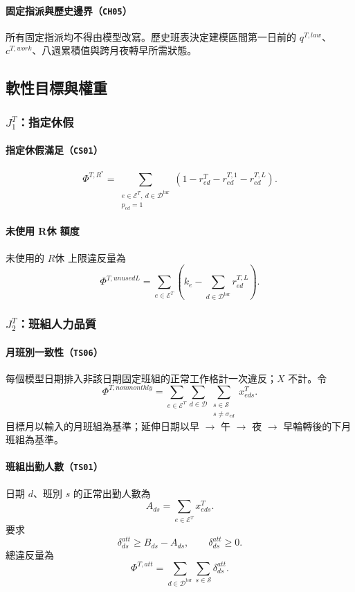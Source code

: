 \documentclass[a4paper,12pt]{article}
\begin{document}
\paragraph{固定指派與歷史邊界（\texttt{CH05}）}
所有固定指派均不得由模型改寫。歷史班表決定建模區間第一日前的
\(q^{T,law}\)、\(c^{T,work}\)、八週累積值與跨月夜轉早所需狀態。

\subsection{軟性目標與權重}

\subsubsection{\texorpdfstring{$J^T_1$}{J1}：指定休假}

\paragraph{指定休假滿足（\texttt{CS01}）}
\[
  \Phi^{T,R^*}
  =
  \sum_{\substack{e\in\mathcal{E}^{T},\ d\in\mathcal{D}^{\mathrm{tar}}\\p_{ed}=1}}
  \left(1-r^{T}_{ed}-r^{T,1}_{ed}-r^{T,L}_{ed}\right).
\]

\paragraph{未使用 R休 額度}
未使用的 \(R休\) 上限違反量為
\[
  \Phi^{T,unusedL}
  =\sum_{e\in\mathcal{E}^{T}}
  \left(k_e-\sum_{d\in\mathcal{D}^{\mathrm{tar}}}r^{T,L}_{ed}\right).
\]

\subsubsection{\texorpdfstring{$J^T_2$}{J2}：班組人力品質}

\paragraph{月班別一致性（\texttt{TS06}）}
每個模型日期排入非該日期固定班組的正常工作格計一次違反；\(X\) 不計。令
\[
  \Phi^{T,nonmonthly}
  =
  \sum_{e\in\mathcal{E}^{T}}
  \sum_{d\in\mathcal{D}}
  \sum_{\substack{s\in\mathcal{S}\\s\neq\sigma_{ed}}}x^{T}_{eds}.
\]
目標月以輸入的月班組為基準；延伸日期以早 \(\rightarrow\) 午 \(\rightarrow\) 夜
\(\rightarrow\) 早輪轉後的下月班組為基準。

\paragraph{班組出勤人數（\texttt{TS01}）}
日期 \(d\)、班別 \(s\) 的正常出勤人數為
\[
  A_{ds}
  =
  \sum_{e\in\mathcal{E}^{T}}x^{T}_{eds}.
\]
要求
\[
  \delta^{att}_{ds}\geq B_{ds}-A_{ds},
  \qquad
  \delta^{att}_{ds}\geq0.
\]
總違反量為
\[
  \Phi^{T,att}
  =
  \sum_{d\in\mathcal{D}^{\mathrm{tar}}}
  \sum_{s\in\mathcal{S}}\delta^{att}_{ds}.
\]
\end{document}
